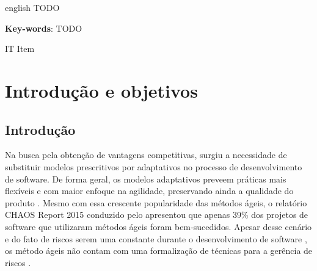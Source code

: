 \documentclass[
    12pt,       %
    openright,      %
    twoside,      %
    a4paper,      %
    english,      %
    french,       %
    spanish,      %
    brazil,       %
    ]{abntex2}
\begin{document}
  \begin{resumo}[Abstract]
   \begin{otherlanguage*}{english}
TODO
     \vspace{\onelineskip}

     \noindent
     \textbf{Key-words}: TODO
   \end{otherlanguage*}
  \end{resumo}

  \listoffigures*
  \cleardoublepage

  \listoftables*
  \cleardoublepage

  \begin{siglas}
    \item[IT] Item
 \end{siglas}

  \tableofcontents*
  \cleardoublepage



  \textual


\chapter{Introdução e objetivos}
\label{sec:Introducao}
\section{Introdução}

Na busca pela obtenção de vantagens competitivas, surgiu a necessidade de substituir modelos prescritivos por adaptativos no processo de desenvolvimento de software. De forma geral, os modelos adaptativos preveem práticas mais flexíveis e com maior enfoque na agilidade, preservando ainda a qualidade do produto \cite{Rech:2013}. Mesmo com essa crescente popularidade das métodos ágeis, o relatório CHAOS Report 2015 conduzido pelo   apresentou que apenas 39\% dos projetos de software que utilizaram métodos ágeis foram bem-sucedidos. Apesar desse cenário e do fato de riscos serem uma constante durante o desenvolvimento de software \cite{Cunha:2013}, os método ágeis não contam com uma formalização de técnicas para a gerência de riscos \cite{Tomanek:2015}.
\end{document}
